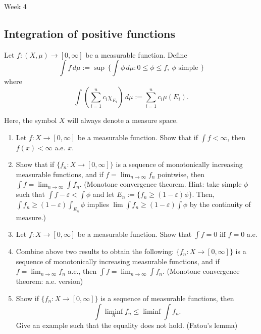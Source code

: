 \documentclass{article}
\def\e{\varepsilon}
\begin{document}
\clearpage

Week 4

\subsection*{Integration of positive functions}
Let $f:(X,\mu)\to[0,\infty]$ be a measurable function.
Define
\[\int f\,d\mu:=\sup\,\bigl\{\int\phi\,d\mu:0\le\phi\le f,\ \phi\text{ simple }\bigr\}\]
where
\[\int(\sum_{i=1}^nc_i\chi_{E_i})\,d\mu:=\sum_{i=1}^nc_i\mu(E_i).\]

Here, the symbol $X$ will always denote a measure space.
\begin{enumerate}
\item Let $f:X\to[0,\infty]$ be a measurable function. Show that if $\int f<\infty$, then $f(x)<\infty$ a.e. $x$.
\item Show that if $\{f_n:X\to[0,\infty]\}$ is a sequence of monotonically increasing measurable functions, and if $f=\lim_{n\to\infty}f_n$ pointwise, then $\int f=\lim_{n\to\infty}\int f_n$. (Monotone convergence theorem. Hint: take simple $\phi$ such that $\int f-\e<\int\phi$ and let $E_n:=\{f_n\ge(1-\e)\phi\}$. Then, $\int f_n\ge(1-\e)\int_{E_n}\phi$ implies $\lim\int f_n\ge(1-\e)\int\phi$ by the continuity of measure.)
\item Let $f:X\to[0,\infty]$ be a measurable function. Show that $\int f=0$ iff $f=0$ a.e.
\item Combine above two results to obtain the following: $\{f_n:X\to[0,\infty]\}$ is a sequence of monotonically increasing measurable functions, and if $f=\lim_{n\to\infty}f_n$ a.e., then $\int f=\lim_{n\to\infty}\int f_n$. (Monotone convergence theorem: a.e. version)
\item Show if $\{f_n:X\to[0,\infty]\}$ is a sequence of measurable functions, then
\[\int\liminf_nf_n\le\liminf\int f_n.\]
Give an example such that the equality does not hold. (Fatou's lemma)
\end{enumerate}
\end{document}
